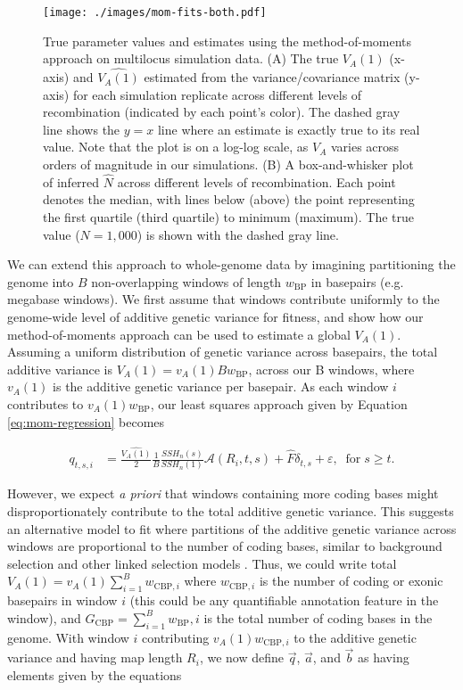 \documentclass[11pt]{article}
\begin{document}
\begin{figure}
  \centering
  \texttt{[image: ./images/mom-fits-both.pdf]} 

  \caption{True parameter values and estimates using the method-of-moments
    approach on multilocus simulation data. (A) The true $V_A(1)$ (x-axis) and
    $\widehat{V_A(1)}$ estimated from the variance/covariance matrix (y-axis)
    for each simulation replicate across different levels of recombination
    (indicated by each point's color). The dashed gray line shows the $y=x$
    line where an estimate is exactly true to its real value. Note that the
    plot is on a log-log scale, as $V_A$ varies across orders of magnitude in
    our simulations. (B) A box-and-whisker plot of inferred $\widehat{N}$
    across different levels of recombination. Each point denotes the median,
    with lines below (above) the point representing the first quartile
  (third quartile) to minimum (maximum). The true value ($N = 1,000$) is shown
with the dashed gray line.} 

\label{fig:mom-fits-both}
\end{figure}

We can extend this approach to whole-genome data by imagining partitioning 
the genome into $B$ non-overlapping windows of length $w_{\textrm{BP}}$ in
basepairs (e.g. megabase windows). We first assume that windows contribute
uniformly to the genome-wide level of additive genetic variance for  fitness,
and show how our method-of-moments approach can be used to estimate a global
$V_A(1)$. Assuming a uniform distribution of genetic variance across basepairs,
the total additive variance is $V_A(1) = v_A(1) B w_{\text{BP}}$, across our B
windows, where $v_A(1)$ is the additive genetic variance per basepair. As each
window $i$ contributes to $v_A(1) w_{\text{BP}}$, our least squares approach
given by Equation \eqref{eq:mom-regression} becomes

\begin{align}
  q_{t,s,i} &= \frac{\widehat{V_A(1)}}{2} \frac{1}{B} \frac{SSH_n(s)}{SSH_n(1)} \mathcal{A} (R_i, t,s ) +
            \widehat{F} \delta_{t,s}+ \varepsilon, \;\;  \text{for} \; s \geq t.
\end{align}

However, we expect \emph{a priori} that windows containing more coding bases
might disproportionately contribute to the total additive genetic variance.
This suggests an alternative model to fit where partitions of the additive
genetic variance across windows are proportional to the number of coding bases,
similar to background selection and other linked selection models
\parencite{Rockman2010-bw,McVicker2009-ax,Corbett-Detig2015-gt}. Thus, we could
write total $V_A(1) = v_A(1) \sum_{i=1}^B w_{\text{CBP},i}$ where
$w_{\text{CBP},i}$ is the number of coding or exonic basepairs in window $i$
(this could be any quantifiable annotation feature in the window), and
$G_\text{CBP} = \sum_{i=1}^B w_{\textrm{BP}},i$ is the total number of coding
bases in the genome. With window $i$ contributing $v_A(1) w_{\text{CBP}, i}$ to the
additive genetic variance and having map length $R_i$, we now define $\vec{q}$,
$\vec{a}$, and $\vec{b}$ as having elements given by the equations
\end{document}
